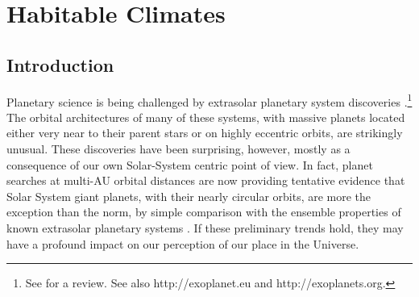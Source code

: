 \chapter[Habitable Climates]{Habitable Climates}
\label{ch:hab}
\markright{}



\section{Introduction}
\label{hab_sec:intro}

Planetary science is being challenged by extrasolar planetary system
discoveries \citep{mayor+queloz1995,marcy+butler1996}.\footnote{See
\citet{reipurth_et_al2007} for a review.  See also http://exoplanet.eu
and http://exoplanets.org.} The orbital architectures of many of these
systems, with massive planets located either very near to their parent
stars or on highly eccentric orbits, are strikingly unusual. These
discoveries have been surprising, however, mostly as a consequence of
our own Solar-System centric point of view. In fact, planet searches
at multi-AU orbital distances are now providing tentative evidence
that Solar System giant planets, with their nearly circular orbits,
are more the exception than the norm, by simple comparison with the
ensemble properties of known extrasolar planetary systems
\citep{marcy_et_al2005}.  If these preliminary trends hold, they may
have a profound impact on our perception of our place in the Universe.

